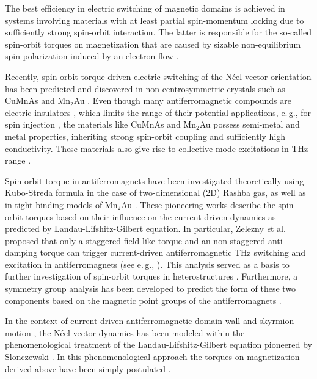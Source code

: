 The best efficiency in electric switching of magnetic domains is achieved in systems involving materials with at least partial spin-momentum locking \cite{Fina2016} due to sufficiently strong spin-orbit interaction. The latter is responsible for the so-called spin-orbit torques on magnetization that are caused by sizable non-equilibrium spin polarization induced by an electron flow \cite{Brataas2012, Hals2013, Zelezny2014, 2014MokrousovSOT, Ghosh2017, SmejkalAFM_2017, Zelezny2018, Zhou2018, Manchon2018, Moriyama2018, Li2019, Chen2019, Zhou2019, Zhou2019a, Bodnar2018}.  

Recently, spin-orbit-torque-driven electric switching of the N\'eel vector orientation has been predicted \cite{Zelezny2014} and discovered in non-centrosymmetric crystals such as CuMnAs \cite{Wadley2016, Fina2016, Zelezny2018, Saidl2017} and Mn$_2$Au \cite{Barthem2013, Jordan2015, Bhattacharjee2018}. Even though many antiferromagnetic compounds are electric insulators \cite{Pandey2017}, which limits the range of their potential applications, e.\,g., for spin injection \cite{Tshitoyan2015}, the materials like CuMnAs and Mn$_2$Au possess  semi-metal and metal properties, inheriting strong spin-orbit coupling and sufficiently high conductivity. These materials also give rise to collective mode excitations in THz range \cite{Bhattacharjee2018}. 

Spin-orbit torque in antiferromagnets have been investigated theoretically using Kubo-Streda formula in the case of two-dimensional (2D) Rashba gas, as well as in tight-binding models of Mn$_2$Au \cite{Zelezny2014, Zelezny2017}. These pioneering works describe the spin-orbit torques based on their influence on the current-driven dynamics as predicted by Landau-Lifshitz-Gilbert equation. In particular, Zelezny {\textit et al.} proposed that only a staggered field-like torque and an non-staggered anti-damping torque can trigger current-driven antiferromagnetic THz switching and excitation in antiferromagnets (see e.\,g., ). This analysis served as a basis to further investigation of spin-orbit torques in heterostructures \cite{ManchonJPCM2017, Ghosh2017, Ghosh2019}. Furthermore, a symmetry group analysis has been developed to predict the form of these two components based on the magnetic point groups of the antiferromagnets \cite{Zelezny2017, Watanabe2018}. 
 
In the context of current-driven antiferromagnetic domain wall \cite{Hals2011} and skyrmion motion \cite{Barker2016, Zhang2016}, the N\'eel vector dynamics has been modeled within the phenomenological treatment of the Landau-Lifshitz-Gilbert equation pioneered by Slonczewski \cite{SLONCZEWSKI1996}. In this phenomenological approach the torques on magnetization derived above have been simply postulated \cite{Gomonay2016AFM, Shiino2016, Akosa2018, Tomasello2017}. 

